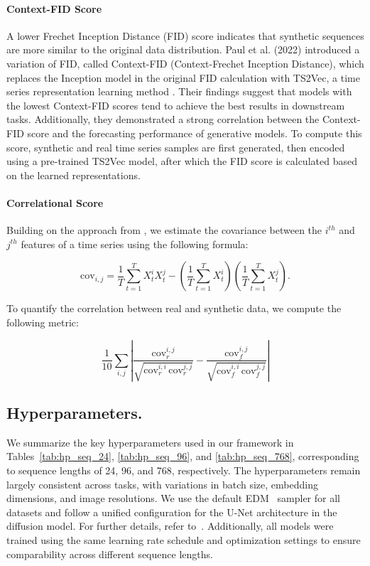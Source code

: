 \documentclass{article}
\theoremstyle{plain}
\theoremstyle{definition}
\theoremstyle{remark}
\begin{document}
{\paragraph{Context-FID Score}
A lower Frechet Inception Distance (FID) score indicates that synthetic sequences are more similar to the original data distribution. Paul et al. (2022) introduced a variation of FID, called Context-FID (Context-Frechet Inception Distance), which replaces the Inception model in the original FID calculation with TS2Vec, a time series representation learning method \cite{yue2022ts2vec}. Their findings suggest that models with the lowest Context-FID scores tend to achieve the best results in downstream tasks. Additionally, they demonstrated a strong correlation between the Context-FID score and the forecasting performance of generative models. To compute this score, synthetic and real time series samples are first generated, then encoded using a pre-trained TS2Vec model, after which the FID score is calculated based on the learned representations.

\paragraph{Correlational Score}
Building on the approach from \cite{liao2020conditional}, we estimate the covariance between the $i^{th}$ and $j^{th}$ features of a time series using the following formula:

\[
\text{cov}_{i,j} = \frac{1}{T} \sum_{t=1}^{T} X_t^{i} X_t^{j} - \left( \frac{1}{T} \sum_{t=1}^{T} X_t^{i} \right) \left( \frac{1}{T} \sum_{t=1}^{T} X_t^{j} \right).
\]

To quantify the correlation between real and synthetic data, we compute the following metric:

\[
\frac{1}{10} \sum_{i,j} \left| \frac{\text{cov}_r^{i,j}}{\sqrt{\text{cov}_r^{i,i} \, \text{cov}_r^{j,j}}} - \frac{\text{cov}_f^{i,j}}{\sqrt{\text{cov}_f^{i,i} \, \text{cov}_f^{j,j}}} \right|
\]


\subsection{Hyperparameters.}
We summarize the key hyperparameters used in our framework in Tables~\ref{tab:hp_seq_24}, \ref{tab:hp_seq_96}, and \ref{tab:hp_seq_768}, corresponding to sequence lengths of 24, 96, and 768, respectively. The hyperparameters remain largely consistent across tasks, with variations in batch size, embedding dimensions, and image resolutions. We use the default EDM~\cite{karras2022elucidating} sampler for all datasets and follow a unified configuration for the U-Net architecture in the diffusion model. For further details, refer to~\cite{karras2022elucidating}. Additionally, all models were trained using the same learning rate schedule and optimization settings to ensure comparability across different sequence lengths.


}
\end{document}
